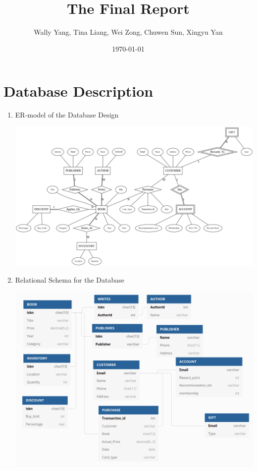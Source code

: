 \documentclass[12pt, letterpaper]{report}
\title{The Final Report}
\author{Wally Yang, Tina Liang, Wei Zong, Chuwen Sun, Xingyu Yan}
\date{\today}
\begin{document}
\maketitle

\section{Database Description}

\begin{enumerate}
  \item ER-model of the Database Design

    \begin{center}
      \includegraphics[width=\linewidth]{ER}
    \end{center}

    \pagebreak

  \item Relational Schema for the Database

    \begin{center}
      \includegraphics[width=\linewidth]{RelationalSchema}
    \end{center}


\end{enumerate}
\end{document}
